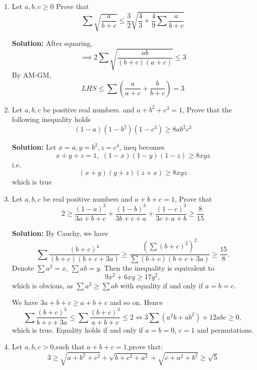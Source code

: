 \documentclass{report}
\begin{document}
\begin{enumerate}
	\item Let $ a,b,c\ge 0$ Prove that$$\sum\sqrt{\frac{a}{b+c}} \le \frac{3}{2}\sqrt{\frac{4}{3}+\frac{4}{9}\sum\frac{a}{b+c}}$$
	
	\textbf{Solution:} After squaring,$$ \implies 2\sum \sqrt {\frac {ab}{(b + c)(a+ c)}}\le3$$ By AM-GM, $$ LHS\le\sum\left( \frac a{a + c} + \frac b{b + c}\right) = 3$$
	\begin{flushright}
	\end{flushright}
	\item Let $a,b,c$ be positive real numbers. and $a+b^2+c^3=1$, Prove that the following inequality holds$$(1-a)(1-b^2)(1-c^3) \geq 8ab^2c^3$$
	
	\textbf{Solution:} Let $ x=a,y=b^2,z=c^3$, ineq becomes $$ x+y+z=1,\,\,(1-x)(1-y)(1-z)\ge 8xyz$$ i.e. $$ (x+y)(y+z)(z+x)\ge8xyz$$ which is true
	\begin{flushright}
	\end{flushright}
	\item Let $ a,b,c$ be real positive numbers and $ a+b+c=1$, Prove that$$2\geq\frac{(1-a)^3}{3a+b+c}+\frac{(1-b)^3}{3b+c+a}+\frac{(1-c)^3}{3c+a+b}\geq\frac{8}{15}$$ 
	
	\textbf{Solution:}  By Cauchy, we have
	\[ \sum \frac{(b+c)^4}{(b+c)(b+c+3a)} \ge \frac{\left( \sum (b+c)^2 \right)^2}{\sum (b+c)(b+c+3a)} \ge \frac{15}{8}.\]
	Denote $ \sum a^2=x$, $ \sum ab=y$. Then the inequality is equivalent to\[ 9x^2+6xy \ge 17y^2,\]which is obvious, as $ \sum a^2 \ge \sum ab$ with equality if and only if $ a=b=c$.
	
	We have $ 3a+b+c \ge a+b+c$ and so on. Hence
	\[ \sum \frac{(b+c)^3}{b+c+3a} \le \sum \frac{(b+c)^3}{a+b+c} \le 2\Leftrightarrow 3\sum (a^2b+ab^2) + 12abc \ge 0,\]which is true. Equality holds if and only if $ a=b=0$, $ c=1$ and permutations.
	\begin{flushright}
	\end{flushright}
	\item Let $a,b,c>0$,such that $a+b+c=1$,prove that:$$3 \geq \sqrt{a+b^2+c^2}+\sqrt{b+c^2+a^2}+\sqrt{c+a^2+b^2} \geq \sqrt{5}$$
	

\end{enumerate}
\end{document}
